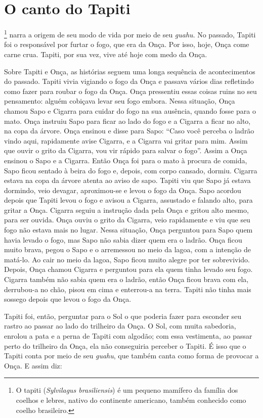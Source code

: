 \chapter{O canto do Tapiti}

\footnote{O tapiti (\emph{Sylvilagus brasiliensis}) é um pequeno
  mamífero da família dos coelhos e lebres, nativo do continente
  americano, também conhecido como coelho brasileiro.} narra a origem de
seu modo de vida por meio de seu \emph{guahu}. No passado, Tapiti foi o
responsável por furtar o fogo, que era da Onça. Por isso, hoje, Onça
come carne crua. Tapiti, por sua vez, vive até hoje com medo da Onça.

Sobre Tapiti e Onça, as histórias seguem uma longa sequência de
acontecimentos do passado. Tapiti vivia vigiando o fogo da Onça e
passava vários dias refletindo como fazer para roubar o fogo da Onça.
Onça pressentiu essas coisas ruins no seu pensamento: alguém cobiçava
levar seu fogo embora. Nessa situação, Onça chamou Sapo e Cigarra para
cuidar do fogo na sua ausência, quando fosse para o mato. Onça instruiu
Sapo para ficar ao lado do fogo e a Cigarra a ficar no alto, na copa da
árvore. Onça ensinou e disse para Sapo: ``Caso você perceba o ladrão
vindo aqui, rapidamente avise Cigarra, e a Cigarra vai gritar para mim.
Assim que ouvir o grito da Cigarra, vou vir rápido para salvar o fogo''.
Assim a Onça ensinou o Sapo e a Cigarra. Então Onça foi para o mato à
procura de comida, Sapo ficou sentado à beira do fogo e, depois, com
corpo cansado, dormiu. Cigarra estava na copa da árvore atenta ao aviso
de sapo. Tapiti viu que Sapo já estava dormindo, veio devagar,
aproximou-se e levou o fogo da Onça. Sapo acordou depois que Tapiti
levou o fogo e avisou a Cigarra, assustado e falando alto, para gritar a
Onça. Cigarra seguiu a instrução dada pela Onça e gritou alto mesmo,
para ser ouvida. Onça ouviu o grito da Cigarra, veio rapidamente e viu
que seu fogo não estava mais no lugar. Nessa situação, Onça perguntou
para Sapo quem havia levado o fogo, mas Sapo não sabia dizer quem era o
ladrão. Onça ficou muito brava, pegou o Sapo e o arremessou no meio da
lagoa, com a intenção de matá-lo. Ao cair no meio da lagoa, Sapo ficou
muito alegre por ter sobrevivido. Depois, Onça chamou Cigarra e
perguntou para ela quem tinha levado seu fogo. Cigarra também não sabia
quem era o ladrão, então Onça ficou brava com ela, derrubou-a no chão,
pisou em cima e enterrou-a na terra. Tapiti não tinha mais sossego
depois que levou o fogo da Onça.

Tapiti foi, então, perguntar para o Sol o que poderia fazer para
esconder seu rastro ao passar ao lado do trilheiro da Onça. O Sol, com
muita sabedoria, enrolou a pata e a perna de Tapiti com algodão; com
essa vestimenta, ao passar perto do trilheiro da Onça, ela não
conseguiria perceber o Tapiti. É isso que o Tapiti conta por meio de seu
\emph{guahu}, que também canta como forma de provocar a Onça. E assim
diz:

